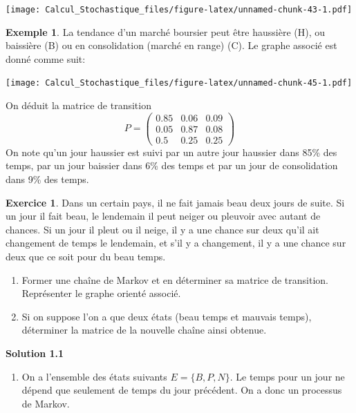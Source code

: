 \documentclass[
]{book}
\providecommand{\tightlist}{%
  \setlength{\itemsep}{0pt}\setlength{\parskip}{0pt}}
\theoremstyle{definition}
\theoremstyle{definition}
\newtheorem{example}{Exemple}[chapter]
\theoremstyle{definition}
\newtheorem{exercise}{Exercice}[chapter]
\theoremstyle{remark}
\begin{document}
\texttt{[image: Calcul\_Stochastique\_files/figure-latex/unnamed-chunk-43-1.pdf]}
\begin{example}
\protect\hypertarget{exm:unnamed-chunk-44}{}{\label{exm:unnamed-chunk-44} }La tendance d'un marché boursier peut être haussière (H), ou baissière (B) ou en consolidation (marché en range) (C). Le graphe associé est donné comme suit:
\end{example}
\texttt{[image: Calcul\_Stochastique\_files/figure-latex/unnamed-chunk-45-1.pdf]}

On déduit la matrice de transition
\[
P=\left( 
\begin{array}{ccc}
0.85 & 0.06 & 0.09 \\
0.05 & 0.87 & 0.08 \\
0.5 & 0.25 & 0.25
\end{array}
\right)
\]
On note qu'un jour haussier est suivi par un autre jour haussier dans 85\% des temps, par un jour baissier dans 6\% des temps et par un jour de consolidation dans 9\% des temps.
\begin{exercise}
\protect\hypertarget{exr:unnamed-chunk-46}{}{\label{exr:unnamed-chunk-46} }Dans un certain pays, il ne fait jamais beau deux jours de suite. Si un jour il fait beau, le lendemain il peut neiger ou pleuvoir avec autant de chances. Si un jour il pleut ou il neige, il y a une chance sur deux qu'il ait changement de temps le lendemain, et s'il y a changement, il y a une chance sur deux que ce soit pour du beau temps.

\begin{enumerate}
\def\labelenumi{\arabic{enumi}.}
\tightlist
\item
  Former une chaîne de Markov et en déterminer sa matrice de transition. Représenter le graphe orienté associé.
\item
  Si on suppose l'on a que deux états (beau temps et mauvais temps), déterminer la matrice de la nouvelle chaîne ainsi obtenue.
\end{enumerate}
\end{exercise}

\textbf{Solution 1.1}

\begin{enumerate}
\def\labelenumi{\arabic{enumi}.}
\tightlist
\item
  On a l'ensemble des états suivants \(E=\{B,P,N \}\). Le temps pour un jour ne dépend que seulement de temps du jour précédent. On a donc un processus de Markov.
\end{enumerate}
\end{document}
